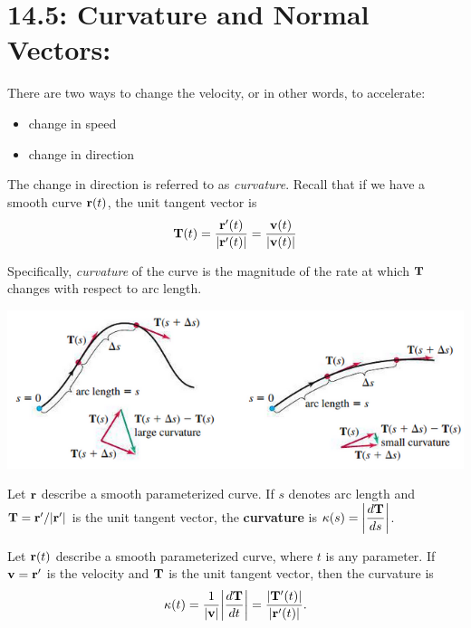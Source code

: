 \documentclass[mathNotesPreamble]{subfiles}
\begin{document}
\section{14.5: Curvature and Normal Vectors:}

  There are two ways to change the velocity, or in other words, to accelerate:
  \begin{itemize}
    \item 
      change in speed
    \item 
      change in direction 
  \end{itemize}
  The change in direction is referred to as \textit{curvature}. Recall that if we have a smooth curve ${\mathbf{r}}(t)$, the unit tangent vector is
    \[{\mathbf{T}}(t)=\frac{{\mathbf{r}}'(t)}{{\left\vert{\mathbf{r}}'(t)\right\vert}}=\frac{{\mathbf{v}}(t)}{{\left\vert{\mathbf{v}}(t)\right\vert}}\]

  Specifically, \textit{curvature} of the curve is the magnitude of the rate at which ${\mathbf{T}}$ changes with respect to arc length.

  \begin{center}
    \includegraphics[width=0.8\linewidth]{images/briggs_14_05/fig14_29}
  \end{center}

  \begin{defn*}[Curvature]
    Let ${\mathbf{r}}$ describe a smooth parameterized curve. If $s$ denotes arc length and ${\mathbf{T}}={\mathbf{r}}'/{\left\vert{\mathbf{r}}'\right\vert}$ is the unit tangent vector, the \textbf{curvature} is $\displaystyle\kappa(s)={\left\vert\frac{d{\mathbf{T}}}{ds}\right\vert}$.
  \end{defn*}
  \pagebreak

  \begin{thmBox*}
    Let ${\mathbf{r}}(t)$ describe a smooth parameterized curve, where $t$ is any parameter. If ${\mathbf{v}}={\mathbf{r}}'$ is the velocity and ${\mathbf{T}}$ is the unit tangent vector, then the curvature is
      \[\kappa(t)=\frac{1}{{\left\vert{\mathbf{v}}\right\vert}}{\left\vert\frac{d{\mathbf{T}}}{dt}\right\vert}=\frac{{\left\vert{\mathbf{T}}'(t)\right\vert}}{{\left\vert{\mathbf{r}}'(t)\right\vert}}.\]
  \end{thmBox*}
\end{document}
